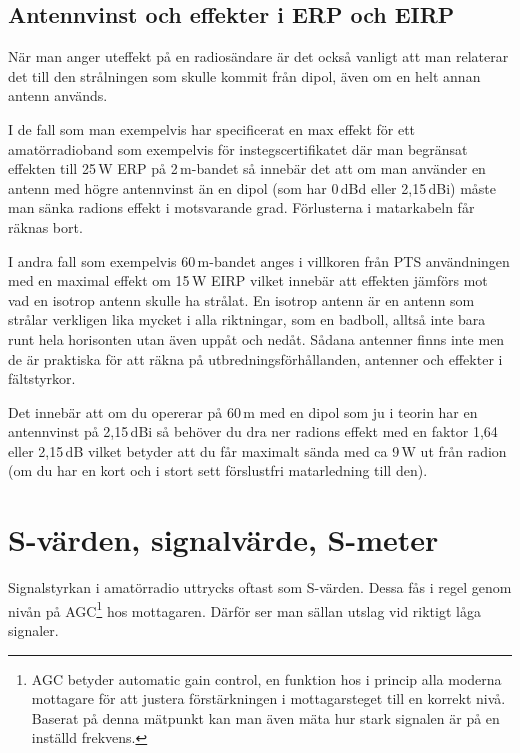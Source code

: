 \subsection{Antennvinst och effekter i ERP och EIRP}

När man anger uteffekt på en radiosändare är det också vanligt att man
relaterar det till den strålningen som skulle kommit från dipol, även om en
helt annan antenn används.

I de fall som man exempelvis har specificerat en max effekt för ett
amatörradioband som exempelvis för instegscertifikatet där man begränsat
effekten till 25\,W ERP på 2\,m-bandet så innebär det att om man använder en
antenn med högre antennvinst än en dipol (som har 0\,dBd eller 2,15\,dBi)
måste man sänka radions effekt i motsvarande grad. Förlusterna i matarkabeln
får räknas bort.

I andra fall som exempelvis 60\,m-bandet anges i villkoren från PTS
användningen med en maximal effekt om 15\,W EIRP vilket innebär att effekten
jämförs mot vad en isotrop antenn skulle ha strålat. En isotrop antenn är en
antenn som strålar verkligen lika mycket i alla riktningar, som en badboll,
alltså inte bara runt hela horisonten utan även uppåt och nedåt. Sådana
antenner finns inte men de är praktiska för att räkna på
utbredningsförhållanden, antenner och effekter i fältstyrkor.

Det innebär att om du opererar på 60\,m med en dipol som ju i teorin har en
antennvinst på 2,15\,dBi så behöver du dra ner radions effekt med en faktor
1,64 eller 2,15\,dB vilket betyder att du får maximalt sända med ca 9\,W ut
från radion (om du har en kort och i stort sett förslustfri matarledning till
den).

\clearpage

\section{S-värden, signalvärde, S-meter}

Signalstyrkan i amatörradio uttrycks oftast som S-värden. Dessa fås i regel
genom nivån på AGC\footnote{AGC betyder automatic gain control, en funktion
hos i princip alla moderna mottagare för att justera förstärkningen i
mottagarsteget till en korrekt nivå. Baserat på denna mätpunkt kan man även
mäta hur stark signalen är på en inställd frekvens.} hos mottagaren. Därför
ser man sällan utslag vid riktigt låga signaler.

